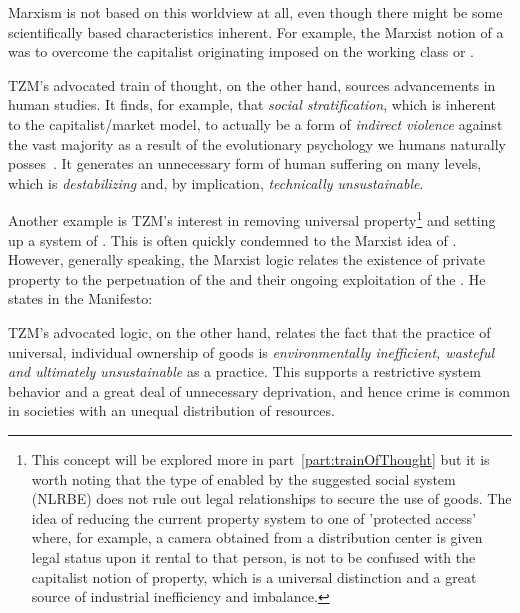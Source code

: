 \documentclass[10pt, a4paper, cleardoubleempty, openright, twoside]{book}
\begin{document}
Marxism is not based on this  worldview at all,
even though there might be some scientifically based characteristics
inherent. For example, the Marxist notion of a  was to overcome the capitalist originating
 imposed on the working class or
.

TZM's advocated train of thought, on the other hand, sources
advancements in human studies. It finds, for example, that \emph{social
stratification}, which is inherent to the capitalist/market model, to
actually be a form of \emph{indirect violence} against the vast majority
as a result of the evolutionary psychology we humans naturally
posses~\cite{Wilkinson::10}. It generates an unnecessary form of human
suffering on many levels, which is \emph{destabilizing} and, by
implication, \emph{technically unsustainable}. 

Another example is TZM's interest in removing universal
property\footnote{
	This concept will be explored more in part~\ref{part:trainOfThought}
	but it is worth noting that the type of  enabled by
	the suggested social system (NLRBE) does not rule out legal
	relationships to secure the use of goods. The idea of reducing the
	current property system to one of 'protected access' where, for
	example, a camera obtained from a distribution center is given legal
	status upon it rental to that person, is not to be confused with the
	capitalist notion of property, which is a universal distinction and a
	great source of industrial inefficiency and imbalance.
} 
and setting up a system of . This is often
quickly condemned to the Marxist idea of . However, generally speaking, the Marxist logic relates the
existence of private property to the perpetuation of the
 and their ongoing exploitation of the
. He states in the Manifesto: 

TZM's advocated logic, on the other hand, relates the fact that the
practice of universal, individual ownership of goods is
\emph{environmentally inefficient, wasteful and ultimately
unsustainable} as a practice. This supports a restrictive system
behavior and a great deal of unnecessary deprivation, and hence crime is
common in societies with an unequal distribution of resources. 
\end{document}
